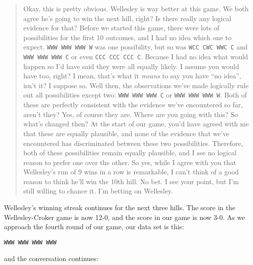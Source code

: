 \begin{quote}
\begin{dialogue}
 Okay, this is pretty obvious. Wellesley is way better at this game. We both agree he's going to win the next hill, right?
 Is there really any logical evidence for that? Before we started this game, there were lots of possibilities for the first 10 outcomes, and I had no idea which one to expect. \texttt{WWW WWW WWW W} was one possibility, but so was \texttt{WCC CWC WWC C} and \texttt{WWW WWW WWW C} or even \texttt{CCC CCC CCC C}. Because I had no idea what would happen so I'd have said they were all equally likely. I assume you would have too, right? I mean, that's what it {\it means} to say you have ``no idea'', isn't it?
 I suppose so.
 Well then, the observations we've made logically rule out all possibilities except two: \texttt{WWW WWW WWW C} or \texttt{WWW WWW WWW W}. Both of these are perfectly consistent with the evidence we've encountered so far, aren't they?  
 Yes, of course they are. Where are you going with this?
 So what's changed then? At the start of our game, you'd have agreed with me that these are equally plausible, and none of the evidence that we've encountered has discriminated between these two possibilities. Therefore, both of these possibilities remain equally plausible, and I see no logical reason to prefer one over the other. So yes, while I agree with you that Wellesley's run of 9 wins in a row is remarkable, I can't think of a good reason to think he'll win the 10th hill. No bet.
 I see your point, but I'm still willing to chance it. I'm betting on Wellesley.
\end{dialogue}
\end{quote}
Wellesley's winning streak continues for the next three hills. The score in the Wellesley-Croker game is now 12-0, and the score in our game is now 3-0. As we approach the fourth round of our game, our data set is this:
\begin{verbatim}
WWW WWW WWW WWW
\end{verbatim}
and the conversation continues:
